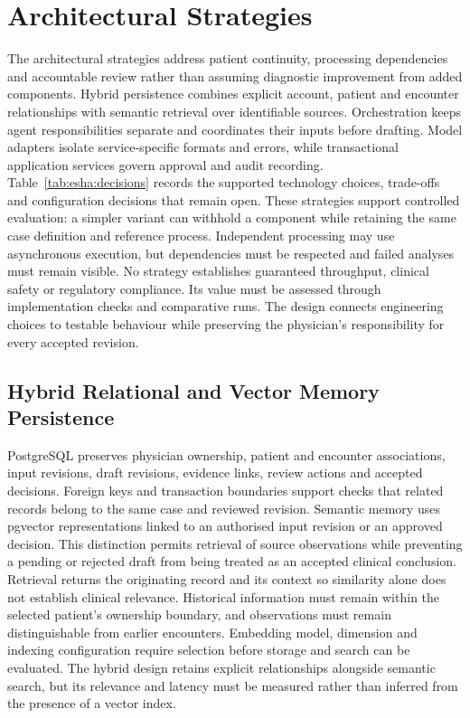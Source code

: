 \section{Architectural Strategies}

The architectural strategies address patient continuity, processing dependencies and accountable review rather than assuming diagnostic improvement from added components. Hybrid persistence combines explicit account, patient and encounter relationships with semantic retrieval over identifiable sources. Orchestration keeps agent responsibilities separate and coordinates their inputs before drafting. Model adapters isolate service-specific formats and errors, while transactional application services govern approval and audit recording. Table~\ref{tab:esha:decisions} records the supported technology choices, trade-offs and configuration decisions that remain open. These strategies support controlled evaluation: a simpler variant can withhold a component while retaining the same case definition and reference process. Independent processing may use asynchronous execution, but dependencies must be respected and failed analyses must remain visible. No strategy establishes guaranteed throughput, clinical safety or regulatory compliance. Its value must be assessed through implementation checks and comparative runs. The design connects engineering choices to testable behaviour while preserving the physician's responsibility for every accepted revision.

\subsection{Hybrid Relational and Vector Memory Persistence}

PostgreSQL preserves physician ownership, patient and encounter associations, input revisions, draft revisions, evidence links, review actions and accepted decisions. Foreign keys and transaction boundaries support checks that related records belong to the same case and reviewed revision. Semantic memory uses pgvector representations linked to an authorised input revision or an approved decision. This distinction permits retrieval of source observations while preventing a pending or rejected draft from being treated as an accepted clinical conclusion. Retrieval returns the originating record and its context so similarity alone does not establish clinical relevance. Historical information must remain within the selected patient's ownership boundary, and observations must remain distinguishable from earlier encounters. Embedding model, dimension and indexing configuration require selection before storage and search can be evaluated. The hybrid design retains explicit relationships alongside semantic search, but its relevance and latency must be measured rather than inferred from the presence of a vector index.


